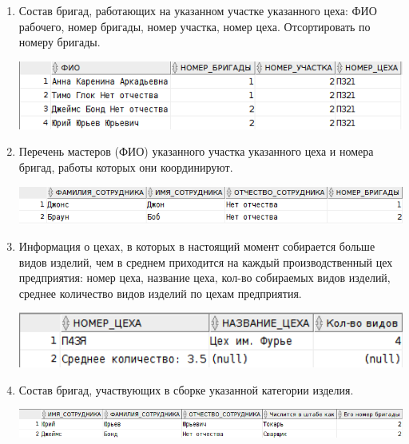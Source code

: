 \begin{enumerate}
    \item Состав бригад, работающих на указанном участке указанного цеха: ФИО рабочего, номер бригады, номер участка, номер цеха. Отсортировать по номеру бригады.

    

    \includegraphics[width=16cm]{./screenshots/results/result6.png}

    \item Перечень мастеров (ФИО) указанного участка указанного цеха и номера бригад, работы которых они координируют.

    

    \includegraphics[width=16cm]{./screenshots/results/result7.png}

    \item Информация о цехах, в которых в настоящий момент собирается больше видов изделий, чем в среднем приходится на каждый производственный цех предприятия: номер цеха, название цеха, кол-во собираемых видов изделий, среднее количество видов изделий по цехам предприятия.

    

    \includegraphics[width=16cm]{./screenshots/results/result8.png}

    \item Состав бригад, участвующих в сборке указанной категории изделия.

    

    \includegraphics[width=16cm]{./screenshots/results/result9.png}


\end{enumerate}
